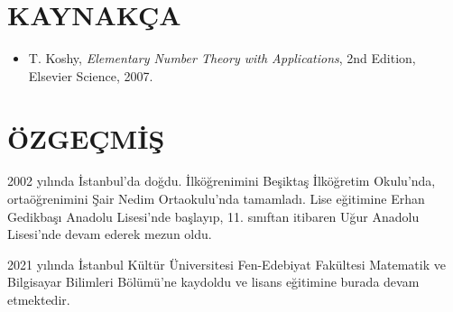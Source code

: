 


\section*{KAYNAKÇA}

\vspace{1em}
\begin{itemize}
    \item[] [1] T. Koshy, \textit{Elementary Number Theory with Applications}, 2nd Edition, Elsevier Science, 2007.
\end{itemize}

\clearpage
\section*{ÖZGEÇMİŞ}

2002 yılında İstanbul’da doğdu. İlköğrenimini Beşiktaş İlköğretim Okulu’nda, 
ortaöğrenimini Şair Nedim Ortaokulu’nda tamamladı. Lise eğitimine Erhan Gedikbaşı Anadolu Lisesi’nde başlayıp, 
11. sınıftan itibaren Uğur Anadolu Lisesi’nde devam ederek mezun oldu.

2021 yılında İstanbul Kültür Üniversitesi Fen-Edebiyat Fakültesi Matematik ve Bilgisayar Bilimleri Bölümü’ne kaydoldu ve lisans eğitimine burada devam etmektedir.

